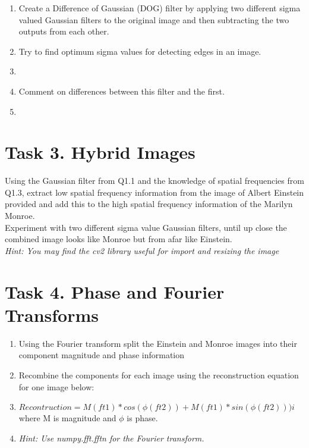 \documentclass[12pt,english]{scrartcl}
\begin{document}
\begin{enumerate}
 \color{black}
 \item Create a Difference of Gaussian (DOG) filter by applying two different sigma valued Gaussian  filters to the original image and then subtracting the two outputs from each other. \\ 

 \color{black}
 \item Try to find optimum sigma values for detecting edges in an image. \\
 \item[]

 \color{black}
 \item Comment on differences between this filter and the first. \\
 \item[]

\end{enumerate}

\section*{Task 3. Hybrid Images}
Using the Gaussian filter from Q1.1 and the knowledge of spatial frequencies from Q1.3, extract low spatial frequency information from the image of Albert Einstein provided and add this to the high spatial frequency information of the Marilyn Monroe. \\

Experiment with two different sigma value Gaussian filters, until up close the combined image looks like Monroe but from afar like Einstein. \\

\textit{Hint: You may find the cv2 library useful for import and resizing the image} \\

\section*{Task 4. Phase and Fourier Transforms}
\begin{enumerate}

\item Using the Fourier transform split the Einstein and Monroe images into their component magnitude and phase information  \\

\item Recombine the components for each image using the reconstruction equation for one image below: \\
\item[]
$Recontruction = M(ft1)*cos(\phi(ft2)) + M(ft1)*sin(\phi(ft2))) i$ \\
where M is magnitude and $\phi$ is phase.
\item[]
\textit{Hint: Use numpy.fft.fftn for the Fourier transform.}
\end{enumerate}
\end{document}
